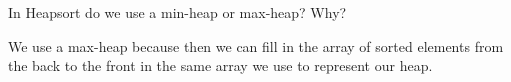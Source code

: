 \question In Heapsort do we use a min-heap or max-heap? Why?

\begin{solution}[0.75in]
We use a max-heap because then we can fill in the array of sorted elements from the back to the front in the same array we use to represent our heap.
\end{solution}